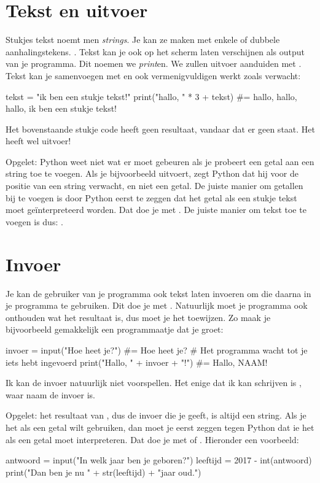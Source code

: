 \section{Tekst en uitvoer}
  Stukjes tekst noemt men \emph{strings}. Je kan ze maken met enkele of dubbele aanhalingstekens.
  .
  Tekst kan je ook op het scherm laten verschijnen als output van je programma.
  Dit noemen we \emph{print}en. We zullen uitvoer aanduiden met \py{\#=}.
  Tekst kan je samenvoegen met \py{+} en ook vermenigvuldigen werkt zoals
  verwacht:
  \begin{python}
    tekst = "ik ben een stukje tekst!"
    print("hallo, " * 3 + tekst)
    #= hallo, hallo, hallo, ik ben een stukje tekst!
  \end{python}
  Het bovenstaande stukje code heeft geen resultaat, vandaar dat er geen
  \py{\#$\Rightarrow$} staat. Het heeft wel uitvoer!

  Opgelet: Python weet niet wat er moet gebeuren als je probeert een getal aan
  een string toe te voegen. Als je bijvoorbeeld  uitvoert,
  zegt Python dat hij voor de positie van  een string verwacht, en
  niet een getal. De juiste manier om getallen bij te voegen is door Python
  eerst te zeggen dat het getal als een stukje tekst moet ge\"interpreteerd
  worden. Dat doe je met . De juiste manier om tekst toe te voegen
  is dus: .

\section{Invoer}
  Je kan de gebruiker van je programma ook tekst laten invoeren om die daarna in
  je programma te gebruiken. Dit doe je met . Natuurlijk moet je programma ook onthouden wat het
  resultaat is, dus moet je het toewijzen. Zo maak je bijvoorbeeld gemakkelijk een
  programmaatje dat je groet:
  \begin{python}
    invoer = input("Hoe heet je?")
    #= Hoe heet je?
    # Het programma wacht tot je iets hebt ingevoerd
    print("Hallo, " + invoer + "!")
    #= Hallo, NAAM!
  \end{python}
  Ik kan de invoer natuurlijk niet voorspellen. Het enige dat ik kan
  schrijven is , waar naam de invoer is.

  Opgelet: het resultaat van , dus de invoer die je geeft, is
  altijd een string. Als je het als een getal wilt gebruiken, dan moet je eerst
  zeggen tegen Python dat ie het als een getal moet interpreteren. Dat doe je
  met  of . Hieronder een voorbeeld:
  \begin{python}
    antwoord = input("In welk jaar ben je geboren?")
    leeftijd = 2017 - int(antwoord)
    print("Dan ben je nu " + str(leeftijd) + "jaar oud.")
  \end{python}

